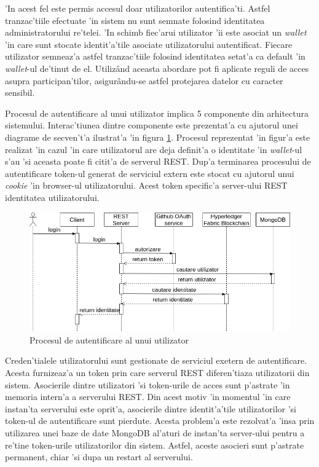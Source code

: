 \documentclass[12pt,a4paper,twoside]{report}
\begin{document}
    'In acest fel este permis accesul doar utilizatorilor autentifica'ti. Astfel tranzac'tiile efectuate 'in sistem nu sunt semnate folosind identitatea administratorului re'telei. 'In schimb fiec'arui utilizator 'ii este asociat un \emph{wallet} 'in care sunt stocate identit'a'tile asociate utilizatorului autentificat. Fiecare utilizator semneaz'a astfel tranzac'tiile folosind identitatea setat'a ca default 'in \emph{wallet}-ul de'tinut de el. Utiliz\^and aceasta abordare pot fi aplicate reguli de acces asupra participan'tilor, asigur\^andu-se astfel protejarea datelor cu caracter sensibil. 
    
    Procesul de autentificare al unui utilizator implica 5 componente din arhitectura sistemului. Interac'tiunea dintre componente este prezentat'a cu ajutorul unei diagrame de secven't'a ilustrat'a 'in figura \ref{fig:auth-seq}. Procesul reprezentat 'in figur'a este realizat 'in cazul 'in care utilizatorul are deja definit'a o identitate 'in \emph{wallet}-ul s'au 'si aceasta poate fi citit'a de serverul REST. Dup'a terminarea procesului de autentificare token-ul generat de serviciul extern este stocat cu ajutorul unui \emph{cookie} 'in browser-ul utilizatorului. Acest token specific'a server-ului REST identitatea utilizatorului. 

 \begin{figure}[H]
		\begin{center}
			\includegraphics[scale=0.5]{img/auth-seq.png}
			\caption{Procesul de  autentificare al unui utilizator}
  			\label{fig:auth-seq}
  		\end{center}
  		\end{figure}
  	
    Creden'tialele utilizatorului sunt gestionate de serviciul exetern de autentificare. Acesta furnizeaz'a un token prin care serverul REST diferen'tiaza utilizatorii din sistem. Asocierile dintre utilizatori 'si token-urile de acces sunt p'astrate 'in memoria intern'a a serverului REST. Din acest motiv 'in momentul 'in care instan'ta serverului este oprit'a, asocierile dintre identit'a'tile utilizatorilor 'si token-ul de autentificare sunt pierdute. Acesta problem'a este rezolvat'a 'insa prin utilizarea unei baze de date MongoDB al'aturi de instan'ta server-ului pentru a re'tine token-urile utilizatorilor din sistem. Astfel, aceste asocieri sunt p'astrate permanent, chiar 'si dupa un restart al serverului.
    
\end{document}
